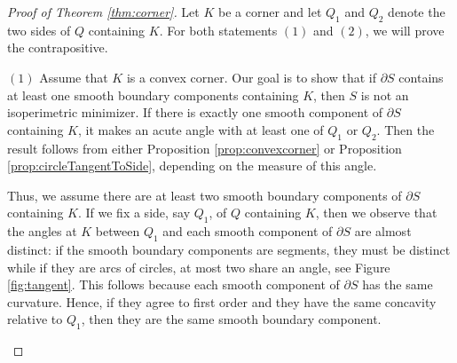 \documentclass[leqno]{article}
\numberwithin{equation}{section}
\theoremstyle{definition}
\theoremstyle{remark}
\theoremstyle{plain}
\begin{document}
\begin{proof}[Proof of Theorem \ref{thm:corner}]  Let $K$ be a corner and let $Q_1$ and $Q_2$ denote the two sides of $Q$ containing $K$.  For both statements $(1)$ and $(2)$, we will prove the contrapositive.

$(1)$ Assume that $K$ is a convex corner.  Our goal is to show that if $\partial S$ contains at least one smooth boundary components containing $K$, then $S$ is not an isoperimetric minimizer.  If there is exactly one smooth component of $\partial S$ containing $K$, it makes an acute angle with at least one of $Q_1$ or $Q_2$.  Then the result follows from either Proposition \ref{prop:convexcorner} or Proposition \ref{prop:circleTangentToSide}, depending on the measure of this angle.

Thus, we assume there are at least two smooth boundary components of $\partial S$ containing $K$.  If we fix a side, say $Q_1$, of $Q$ containing $K$, then we observe that the angles at $K$ between $Q_1$ and each smooth component of $\partial S$ are almost distinct: if the smooth boundary components are segments, they must be distinct while if they are arcs of circles, at most two share an angle, see Figure \ref{fig:tangent}.  This follows because each smooth component of $\partial S$ has the same curvature. Hence, if they agree to first order and they have the same concavity relative to $Q_1$, then they are the same smooth boundary component.


\begin{center}
\centering
{}
\end{center}
\end{proof}
\end{document}
